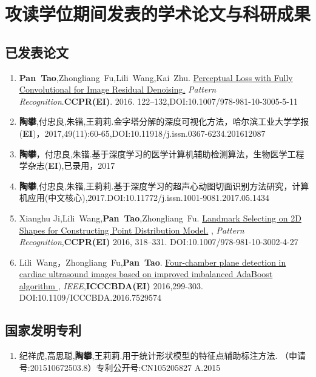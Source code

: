 
\chapter{攻读学位期间发表的学术论文与科研成果}

\section*{已发表论文}
\begin{enumerate}

\item {\textbf{Pan~Tao},Zhongliang~Fu,Lili~Wang,Kai~Zhu.
{\href{http://link.springer.com/10.1007/978-981-10-3005-5_11}
{Perceptual Loss with Fully Convolutional for Image Residual Denoising.}
{ \textit{Pattern Recognition}}.\textbf{CCPR(EI)}. 2016. 122--132,DOI:10.1007/978-981-10-3005-5-11}}

\item {\textbf{陶攀},付忠良,朱锴,王莉莉.{金字塔分解的深度可视化方法}，{哈尔滨工业大学学报(\textbf{EI})}，2017,49(11):60-65,DOI:10.11918/j.issn.0367-6234.201612087}

\item{\textbf{陶攀}，付忠良,朱锴.{基于深度学习的医学计算机辅助检测算法}，{生物医学工程学杂志(\textbf{EI}),已录用}，2017}
\item {\textbf{陶攀},付忠良,朱锴,王莉莉.{基于深度学习的超声心动图切面识别方法研究}，{计算机应用(中文核心),2017.DOI:10.11772/j.issn.1001-9081.2017.05.1434} }

\item{Xianghu Ji,Lili~Wang,\textbf{Pan~Tao},Zhongliang~Fu.
{\href{http://link.springer.com/10.1007/978-981-10-3002-4_27}
{Landmark Selecting on 2D Shapes for Constructing 
Point Distribution Model.}
,{ \textit{Pattern Recognition}},\textbf{CCPR(EI)} 2016,
318--331.
DOI:10.1007/978-981-10-3002-4-27}}

\item {Lili~Wang，Zhongliang~Fu,\textbf{Pan~Tao}.
{\href{http://ieeexplore.ieee.org/document/7529574}
{Four-chamber plane detection in cardiac ultrasound
 images based on improved imbalanced AdaBoost algorithm },
{ \textit{IEEE}},\textbf{ICCCBDA(EI)} 2016,299-303.
DOI:10.1109/ICCCBDA.2016.7529574}}

\end{enumerate}
\section*{国家发明专利}
\begin{enumerate}
\item { 纪祥虎,高思聪,\textbf{陶攀},王莉莉.{用于统计形状模型的特征点辅助标注方法. {（申请号:201510672503.8）专利公开号:CN105205827 A}.{2015}}}
\end{enumerate}
